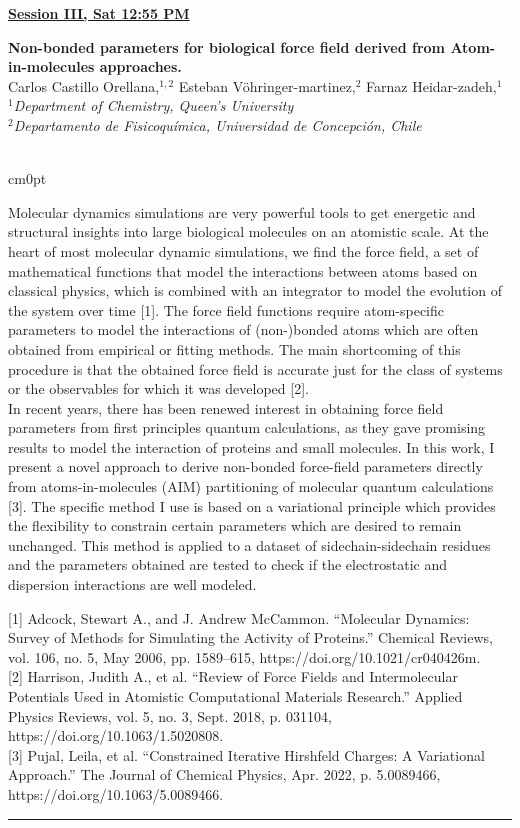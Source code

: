 \documentclass[titlepage,oneside,openany,10pt]{book}
\newenvironment{oralabswrefwfig}[8] %
        {
        \newcommand{\oralref}{#5}
	\FPeval{\cutw}{clip(16.7-#7)}
	\FPeval{\cutl}{round(#8/0.35,3)}
        \begin{flushright}
                \underline{\textbf{#4}}
        \end{flushright}
        \textbf{#1}\\%
        #2\\%
        \textit{#3}\\\\%
        \def\windowpagestuff{\centering
                \texttt{[image: \#6]}}
        \opencutright
        \begin{cutout}{0}{\cutw cm}{0pt}{\RoundingUpFunction{\cutl}}
        \noindent
        }
        {
        \end{cutout}
        \vspace{0.5cm}
        \noindent \oralref \\ \noindent\rule{15cm}{0.5pt}%
        }
\begin{document}
\begin{oralabswrefwfig}
	{Non-bonded parameters for biological force field derived from Atom-in-molecules approaches.}
	{Carlos Castillo Orellana,$^{1,2}$ Esteban V\"{o}hringer-martinez,$^{2}$ Farnaz Heidar-zadeh,$^{1}$}
	{
	$^1$Department of Chemistry, Queen's University\\
	$^2$Departamento de Fisicoquímica, Universidad de Concepción, Chile
	}
	{Session III, Sat 12:55 PM}
	{
	{[1]} Adcock, Stewart A., and J. Andrew McCammon. ``Molecular Dynamics:~ Survey of Methods for Simulating the Activity of Proteins.'' Chemical Reviews, vol. 106, no. 5, May 2006, pp. 1589--615, https://doi.org/10.1021/cr040426m.\\
	{[2]} Harrison, Judith A., et al. ``Review of Force Fields and Intermolecular Potentials Used in Atomistic Computational Materials Research.'' Applied Physics Reviews, vol. 5, no. 3, Sept. 2018, p. 031104, https://doi.org/10.1063/1.5020808.\\
	{[3]} Pujal, Leila, et al. ``Constrained Iterative Hirshfeld Charges: A Variational Approach.'' The Journal of Chemical Physics, Apr. 2022, p. 5.0089466, https://doi.org/10.1063/5.0089466.
	}
	{abstract_figures/Castillo Orellana_Carlos Andres_Oral.png}
	{10.0}
	{4.0}
	Molecular dynamics simulations are very powerful tools to get energetic and structural insights into large biological molecules on an atomistic scale. At the heart of most molecular dynamic simulations, we find the force field, a set of mathematical functions that model the interactions between atoms based on classical physics, which is combined with an integrator to model the evolution of the system over time {[}1{]}. The force field functions require atom-specific parameters to model the interactions of (non-)bonded atoms which are often obtained from empirical or fitting methods. The main shortcoming of this procedure is that the obtained force field is accurate just for the class of systems or the observables for which it was developed {[}2{]}.\\In recent years, there has been renewed interest in obtaining force field parameters from first principles quantum calculations, as they gave promising results to model the interaction of proteins and small molecules. In this work, I present a novel approach to derive non-bonded force-field parameters directly from atoms-in-molecules (AIM) partitioning of molecular quantum calculations {[}3{]}. The specific method I use is based on a variational principle which provides the flexibility to constrain certain parameters which are desired to remain unchanged. This method is applied to a dataset of sidechain-sidechain residues and the parameters obtained are tested to check if the electrostatic and dispersion interactions are well modeled.
	\label{Castillo orellanaC}
\end{oralabswrefwfig}
\end{document}
